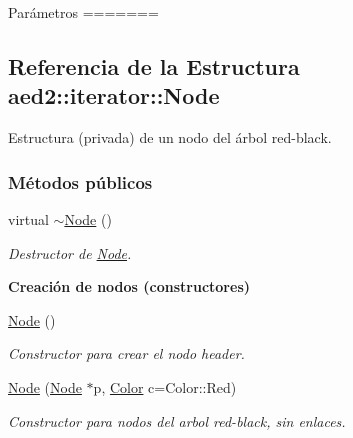 \begin{DoxyParams}{\-Parámetros}
=======
\hypertarget{structaed2_1_1iterator_1_1Node}{}\subsection{Referencia de la Estructura aed2\+:\+:iterator\+:\+:Node}
\label{structaed2_1_1iterator_1_1Node}


Estructura (privada) de un nodo del árbol red-\/black.  


\subsubsection*{Métodos públicos}
\begin{DoxyCompactItemize}
\item 
virtual \hyperlink{structaed2_1_1iterator_1_1Node_ab9a8f2970d15b72a4d1d20f8bf853d4b_ab9a8f2970d15b72a4d1d20f8bf853d4b}{$\sim$\+Node} ()
\begin{DoxyCompactList}\small\item\em Destructor de \hyperlink{structaed2_1_1iterator_1_1Node}{Node}. \end{DoxyCompactList}\end{DoxyCompactItemize}
\begin{Indent}\textbf{ Creación de nodos (constructores)}\par
\begin{DoxyCompactItemize}
\item 
\hyperlink{structaed2_1_1iterator_1_1Node_a143f108a38e8990d7d60ad48dd521654_a143f108a38e8990d7d60ad48dd521654}{Node} ()
\begin{DoxyCompactList}\small\item\em Constructor para crear el nodo header. \end{DoxyCompactList}\item 
\hyperlink{structaed2_1_1iterator_1_1Node_a1f7307020ba416915f60d2dd938df845_a1f7307020ba416915f60d2dd938df845}{Node} (\hyperlink{structaed2_1_1iterator_1_1Node}{Node} $\ast$p, \hyperlink{classaed2_1_1iterator_aaa188f82ba585d8de525b1400242cf4f_aaa188f82ba585d8de525b1400242cf4f}{Color} c=Color\+::\+Red)
\begin{DoxyCompactList}\small\item\em Constructor para nodos del arbol red-\/black, sin enlaces. \end{DoxyCompactList}\end{DoxyCompactItemize}
\end{Indent}

\end{DoxyParams}
